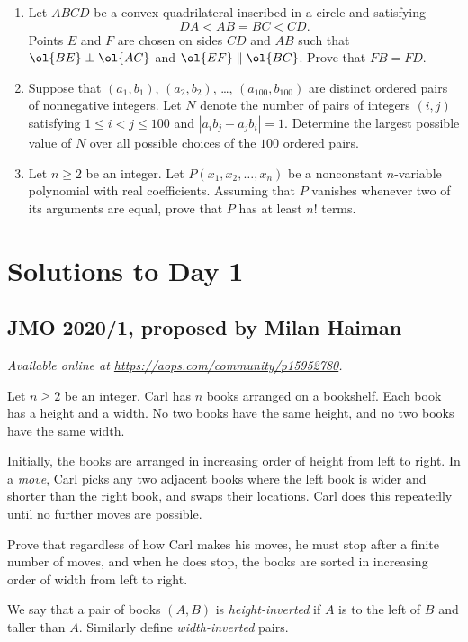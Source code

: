 \documentclass[11pt]{scrartcl}
\begin{document}
\begin{enumerate}[\bfseries 1.]
\item %
Let $ABCD$ be a convex quadrilateral inscribed in a circle and satisfying
\[ DA < AB = BC < CD. \]
Points $E$ and $F$ are chosen on sides $CD$ and $AB$
such that $\ol{BE} \perp \ol{AC}$ and $\ol{EF} \parallel \ol{BC}$.
Prove that $FB=FD$.

\item %
Suppose that $(a_1, b_1)$, $(a_2, b_2)$, \dots, $(a_{100}, b_{100})$
are distinct ordered pairs of nonnegative integers.
Let $N$ denote the number of pairs of integers $(i,j)$ satisfying
$1 \le i < j \le 100$ and $\left\lvert a_ib_j - a_jb_i \right\rvert = 1$.
Determine the largest possible value of $N$
over all possible choices of the $100$ ordered pairs.

\item %
Let $n \ge 2$ be an integer.
Let $P(x_1, x_2, \dots, x_n)$ be a nonconstant
$n$-variable polynomial with real coefficients.
Assuming that $P$ vanishes whenever two of its arguments are equal,
prove that $P$ has at least $n!$ terms.

\end{enumerate}
\pagebreak

\section{Solutions to Day 1}
\subsection{JMO 2020/1, proposed by Milan Haiman}
\textsl{Available online at \url{https://aops.com/community/p15952780}.}
\begin{mdframed}[style=mdpurplebox,frametitle={Problem statement}]
Let $n \ge 2$ be an integer.
Carl has $n$ books arranged on a bookshelf.
Each book has a height and a width.
No two books have the same height,
and no two books have the same width.

Initially, the books are arranged in
increasing order of height from left to right.
In a \emph{move}, Carl picks any two adjacent books
where the left book is wider and shorter than the right book,
and swaps their locations.
Carl does this repeatedly until no further moves are possible.

Prove that regardless of how Carl makes his moves,
he must stop after a finite number of moves, and when he does stop,
the books are sorted in increasing order of width from left to right.
\end{mdframed}
We say that a pair of books $(A,B)$ is \emph{height-inverted}
if $A$ is to the left of $B$ and taller than $A$.
Similarly define \emph{width-inverted} pairs.
\end{document}
